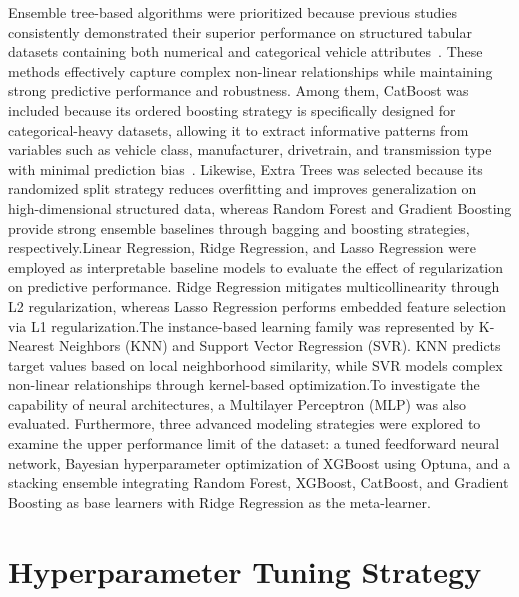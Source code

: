 Ensemble tree-based algorithms were prioritized because previous studies consistently demonstrated their superior performance on structured tabular datasets containing both numerical and categorical vehicle attributes~\cite{atique2026explainable}\cite{grinsztajn2022tree}\cite{malashin2025boosting}. These methods effectively capture complex non-linear relationships while maintaining strong predictive performance and robustness.
Among them, CatBoost was included because its ordered boosting strategy is specifically designed for categorical-heavy datasets, allowing it to extract informative patterns from variables such as vehicle class, manufacturer, drivetrain, and transmission type with minimal prediction bias~\cite{atique2026explainable}. Likewise, Extra Trees was selected because its randomized split strategy reduces overfitting and improves generalization on high-dimensional structured data, whereas Random Forest and Gradient Boosting provide strong ensemble baselines through bagging and boosting strategies, respectively.Linear Regression, Ridge Regression, and Lasso Regression were employed as interpretable baseline models to evaluate the effect of regularization on predictive performance. Ridge Regression mitigates multicollinearity through L2 regularization, whereas Lasso Regression performs embedded feature selection via L1 regularization.The instance-based learning family was represented by K-Nearest Neighbors (KNN) and Support Vector Regression (SVR). KNN predicts target values based on local neighborhood similarity, while SVR models complex non-linear relationships through kernel-based optimization.To investigate the capability of neural architectures, a Multilayer Perceptron (MLP) was also evaluated. Furthermore, three advanced modeling strategies were explored to examine the upper performance limit of the dataset: a tuned feedforward neural network, Bayesian hyperparameter optimization of XGBoost using Optuna, and a stacking ensemble integrating Random Forest, XGBoost, CatBoost, and Gradient Boosting as base learners with Ridge Regression as the meta-learner.


\section{Hyperparameter Tuning Strategy}

